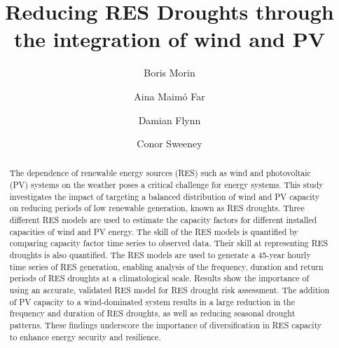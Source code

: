 \documentclass[preprint, 12pt, authoryear]{elsarticle}
\begin{document}
\begin{frontmatter}

\title{Reducing RES Droughts through the integration of wind and PV} %

\author[Math]{Boris Morin } %

\author[Math]{Aina Maimó Far} %

\author[Eng]{Damian Flynn} %

\author[Math]{Conor Sweeney} %




\begin{abstract}
The dependence of renewable energy sources (RES) such as wind and photovoltaic (PV) systems on the weather poses a critical challenge for energy systems. This study investigates the impact of targeting a balanced distribution of wind and PV capacity on reducing periods of low renewable generation, known as RES droughts. Three different RES models are used to estimate the capacity factors for different installed capacities of wind and PV energy. The skill of the RES models is quantified by comparing capacity factor time series to observed data. Their skill at representing RES droughts is also quantified. The RES models are used to generate a 45-year hourly time series of RES generation, enabling analysis of the frequency, duration and return periods of RES droughts at a climatological scale. Results show the importance of using an accurate, validated RES model for RES drought risk assessment. The addition of PV capacity to a wind-dominated system results in a large reduction in the frequency and duration of RES droughts, as well as reducing seasonal drought patterns. These findings underscore the importance of diversification in RES capacity to enhance energy security and resilience.
\end{abstract}


\end{frontmatter}
\end{document}
